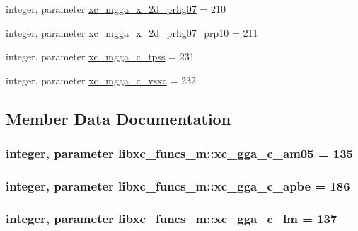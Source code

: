 \begin{DoxyCompactItemize}
\item 
integer, parameter \hyperlink{classlibxc__funcs__m_a4169667a0e0c669e2e977ebaad4fe747}{xc\-\_\-mgga\-\_\-x\-\_\-2d\-\_\-prhg07} = 210
\item 
integer, parameter \hyperlink{classlibxc__funcs__m_aa9336b7440e3578ed201895e558ebcc9}{xc\-\_\-mgga\-\_\-x\-\_\-2d\-\_\-prhg07\-\_\-prp10} = 211
\item 
integer, parameter \hyperlink{classlibxc__funcs__m_a9ca267ae9937489eb953c33ccec86509}{xc\-\_\-mgga\-\_\-c\-\_\-tpss} = 231
\item 
integer, parameter \hyperlink{classlibxc__funcs__m_ad82b075333673603ec9ffe11b5d01c31}{xc\-\_\-mgga\-\_\-c\-\_\-vsxc} = 232
\end{DoxyCompactItemize}


\subsection{Member Data Documentation}
\hypertarget{classlibxc__funcs__m_a0fa2075d2bad4a98732325a0e3b66943}{
\subsubsection[{xc\-\_\-gga\-\_\-c\-\_\-am05}]{\setlength{\rightskip}{0pt plus 5cm}integer, parameter libxc\-\_\-funcs\-\_\-m\-::xc\-\_\-gga\-\_\-c\-\_\-am05 = 135}}\label{classlibxc__funcs__m_a0fa2075d2bad4a98732325a0e3b66943}
\hypertarget{classlibxc__funcs__m_a7c4d808330074f7ffaafe1ae4f2bd7d6}{
\subsubsection[{xc\-\_\-gga\-\_\-c\-\_\-apbe}]{\setlength{\rightskip}{0pt plus 5cm}integer, parameter libxc\-\_\-funcs\-\_\-m\-::xc\-\_\-gga\-\_\-c\-\_\-apbe = 186}}\label{classlibxc__funcs__m_a7c4d808330074f7ffaafe1ae4f2bd7d6}
\hypertarget{classlibxc__funcs__m_a70e8a6af323a26bc3abd717ae8219ba4}{
\subsubsection[{xc\-\_\-gga\-\_\-c\-\_\-lm}]{\setlength{\rightskip}{0pt plus 5cm}integer, parameter libxc\-\_\-funcs\-\_\-m\-::xc\-\_\-gga\-\_\-c\-\_\-lm = 137}}\label{classlibxc__funcs__m_a70e8a6af323a26bc3abd717ae8219ba4}
